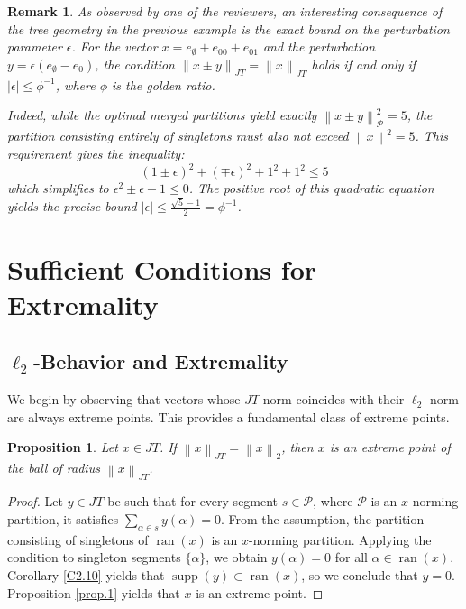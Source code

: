 \documentclass[11pt,a4paper]{amsart}
\newtheorem{proposition}[theorem]{Proposition}
\newtheorem{remark}[theorem]{Remark}
\newcommand{\JT}{JT}
\newcommand{\norm}[1]{\left\lVert#1\right\rVert}
\newcommand{\supp}{\operatorname{supp}}
\newcommand{\ran}{\operatorname{ran}}
\begin{document}
\begin{remark}
    As observed by one of the reviewers, an interesting consequence of the tree geometry in the previous example is the exact bound on the perturbation parameter $\epsilon$. For the vector $x = e_{\emptyset} + e_{00} + e_{01}$ and the perturbation $y = \epsilon(e_{\emptyset} - e_0)$, the condition $\norm{x \pm y}_{\JT} = \norm{x}_{\JT}$ holds if and only if $|\epsilon| \le \phi^{-1}$, where $\phi$ is the golden ratio. 
    
    Indeed, while the optimal merged partitions yield exactly $\norm{x \pm y}_{\mathcal{P}}^2 = 5$, the partition consisting entirely of singletons must also not exceed $\norm{x}^2 = 5$. This requirement gives the inequality:
    \[ (1 \pm \epsilon)^2 + (\mp \epsilon)^2 + 1^2 + 1^2 \le 5 \]
    which simplifies to $\epsilon^2 \pm \epsilon - 1 \le 0$. The positive root of this quadratic equation yields the precise bound $|\epsilon| \le \frac{\sqrt{5}-1}{2} = \phi^{-1}$.
\end{remark}

\section{Sufficient Conditions for Extremality}

\subsection{$\ell_2$-Behavior and Extremality}

We begin by observing that vectors whose $\JT$-norm coincides with their $\ell_2$-norm are always extreme points. This provides a fundamental class of extreme points.

\begin{proposition}\label{prop:l2_extreme}
    Let $x \in \JT$. If $\norm{x}_{\JT} = \norm{x}_2$, then $x$ is an extreme point of the ball of radius $\norm{x}_{\JT}$.
\end{proposition}

\begin{proof}
    Let $y \in \JT$ be such that for every segment $s \in \mathcal{P}$, where $\mathcal{P}$ is an $x$-norming partition, it satisfies $\sum_{\alpha \in s} y(\alpha) = 0$. From the assumption, the partition consisting of singletons of $\ran(x)$ 
     is an $x$-norming partition. Applying the condition to singleton segments $\{ \alpha \}$, we obtain $y(\alpha) = 0$ for all $\alpha \in \ran(x)$.
    Corollary \ref{C2.10} yields that  $\supp(y) \subset \ran(x)$, so we conclude that $y = 0$. Proposition \ref{prop.1} yields that $x$ is an extreme point.
\end{proof}
\end{document}
